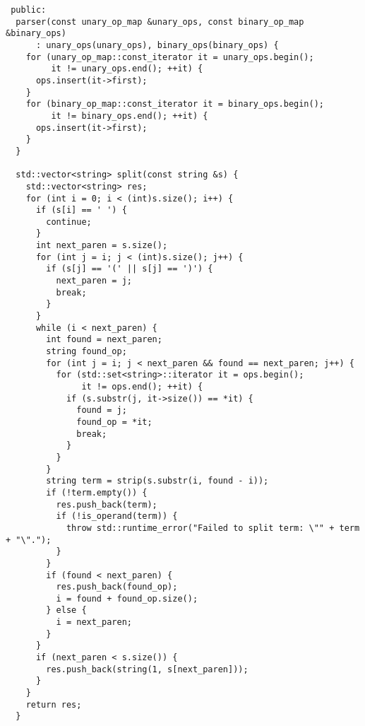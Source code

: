 \begin{lstlisting}
 public:
  parser(const unary_op_map &unary_ops, const binary_op_map &binary_ops)
      : unary_ops(unary_ops), binary_ops(binary_ops) {
    for (unary_op_map::const_iterator it = unary_ops.begin();
         it != unary_ops.end(); ++it) {
      ops.insert(it->first);
    }
    for (binary_op_map::const_iterator it = binary_ops.begin();
         it != binary_ops.end(); ++it) {
      ops.insert(it->first);
    }
  }

  std::vector<string> split(const string &s) {
    std::vector<string> res;
    for (int i = 0; i < (int)s.size(); i++) {
      if (s[i] == ' ') {
        continue;
      }
      int next_paren = s.size();
      for (int j = i; j < (int)s.size(); j++) {
        if (s[j] == '(' || s[j] == ')') {
          next_paren = j;
          break;
        }
      }
      while (i < next_paren) {
        int found = next_paren;
        string found_op;
        for (int j = i; j < next_paren && found == next_paren; j++) {
          for (std::set<string>::iterator it = ops.begin();
               it != ops.end(); ++it) {
            if (s.substr(j, it->size()) == *it) {
              found = j;
              found_op = *it;
              break;
            }
          }
        }
        string term = strip(s.substr(i, found - i));
        if (!term.empty()) {
          res.push_back(term);
          if (!is_operand(term)) {
            throw std::runtime_error("Failed to split term: \"" + term + "\".");
          }
        }
        if (found < next_paren) {
          res.push_back(found_op);
          i = found + found_op.size();
        } else {
          i = next_paren;
        }
      }
      if (next_paren < s.size()) {
        res.push_back(string(1, s[next_paren]));
      }
    }
    return res;
  }


\end{lstlisting}
